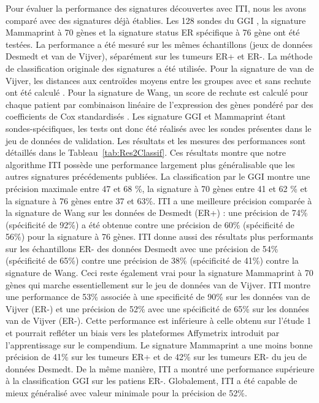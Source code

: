 		Pour évaluer la performance des signatures découvertes avec ITI, nous les avons comparé avec des signatures déjà établies.
		Les 128 sondes du \acs{GGI} \citet{Sotiriou2006}, la signature Mammaprint à 70 gènes \citet{vandeVijver2002} et la signature status ER spécifique à 76 gène \citet{Wang2005} ont été testées.
		La performance a été mesuré sur les mêmes échantillons (jeux de données Desmedt et van de Vijver), séparément sur les tumeurs ER+ et ER-.
		La méthode de classification originale des signatures a été utilisée.
		Pour la signature de van de Vijver, les distances aux centroïdes moyens entre les groupes avec et sans rechute ont été calculé \citet{vandeVijver2002}.
		Pour la signature de Wang, un score de rechute est calculé pour chaque patient par combinaison linéaire de l'expression des gènes pondéré par des coefficients de Cox standardisés \citet{Wang2005}.
		Les signature GGI et Mammaprint étant sondes-spécifiques, les tests ont donc été réalisés avec les sondes présentes dans le jeu de données de validation.
		Les résultats et les mesures des performances sont détaillés dans le Tableau~\ref{tab:Res2Classif}.
		Ces résultats montre que notre algorithme ITI possède une performance largement plus généralisable que les autres signatures précédements publiées.
		La classification par le GGI montre une précision maximale entre 47 et 68 \%, la signature à 70 gènes entre 41 et 62 \% et la signature à 76 gènes entre 37 et 63\%.
		ITI a une meilleure précision comparée à la signature de Wang sur les données de Desmedt (ER+) : une précision de 74\% (spécificité de 92\%) a été obtenue contre une précision de 60\% (spécificité de 56\%) pour la signature à 76 gènes.
		ITI donne aussi des résultats plus performants sur les échantillons ER- des données Desmedt avec une précision de 54\% (spécificité de 65\%) contre une précision de 38\% (spécificité de 41\%) contre la signature de Wang.
		Ceci reste également vrai pour la signature Mammaprint à 70 gènes qui marche essentiellement sur le jeu de données van de Vijver.
		ITI montre une performance de 53\% associée à une specificité de 90\% sur les données van de Vijver (ER-) et une précision de 52\% avec une spécificité de 65\% sur les données van de Vijver (ER-). 
		Cette performance est inférieure à celle obtenu sur l'étude 1 et pourrait refléter un biais vers les plateformes Affymetrix introduit par l'apprentissage sur le compendium. 
		Le signature Mammaprint a une moins bonne précision de 41\% sur les tumeurs ER+ et de 42\% sur les tumeurs ER- du jeu de données Desmedt.
		De la même manière, ITI a montré une performance supérieure à la classification GGI sur les patiens ER-.
		Globalement, ITI a été capable de mieux généralisé avec valeur minimale pour la précision de 52\%.

